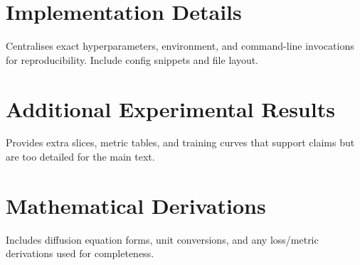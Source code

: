 
\appendix

\chapter{Implementation Details}

Centralises exact hyperparameters, environment, and command-line invocations for reproducibility. Include config snippets and file layout.


\chapter{Additional Experimental Results}

Provides extra slices, metric tables, and training curves that support claims but are too detailed for the main text.


\chapter{Mathematical Derivations}

Includes diffusion equation forms, unit conversions, and any loss/metric derivations used for completeness.

